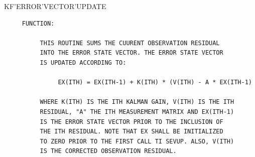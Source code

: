 \begin{frame}
KF'ERROR'VECTOR'UPDATE
\begin{verbatim}
     FUNCTION:

          THIS ROUTINE SUMS THE CUURENT OBSERVATION RESIDUAL
          INTO THE ERROR STATE VECTOR. THE ERROR STATE VECTOR
          IS UPDATED ACCORDING TO:

               EX(ITH) = EX(ITH-1) + K(ITH) * (V(ITH) - A * EX(ITH-1)

          WHERE K(ITH) IS THE ITH KALMAN GAIN, V(ITH) IS THE ITH
          RESIDUAL, "A" THE ITH MEASUREMENT MATRIX AND EX(ITH-1)
          IS THE ERROR STATE VECTOR PRIOR TO THE INCLUSION OF
          THE ITH RESIDUAL. NOTE THAT EX SHALL BE INITIALIZED
          TO ZERO PRIOR TO THE FIRST CALL TI SEVUP. ALSO, V(ITH)
          IS THE CORRECTED OBSERVATION RESIDUAL.


\end{verbatim}
\end{frame}
